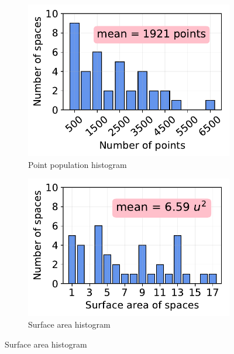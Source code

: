 \begin{figure}[t]
	\centering
	\begin{subfigure}[]{0.49\columnwidth}
		\centering
		\includegraphics[width=\textwidth]{figures/plots/hist-point-count}
		\vspace{-5mm}
		\caption{Point population histogram}
		\label{fig:hist-point-count}
	\end{subfigure}
	\begin{subfigure}[]{0.49\columnwidth}
		\centering
		\includegraphics[width=\textwidth]{figures/plots/hist-surface-area}
		\vspace{-2mm}
		\caption{Surface area histogram}
		\label{fig:hist-surface-area}
	\end{subfigure}
	\vspace{2mm}

\end{figure}

